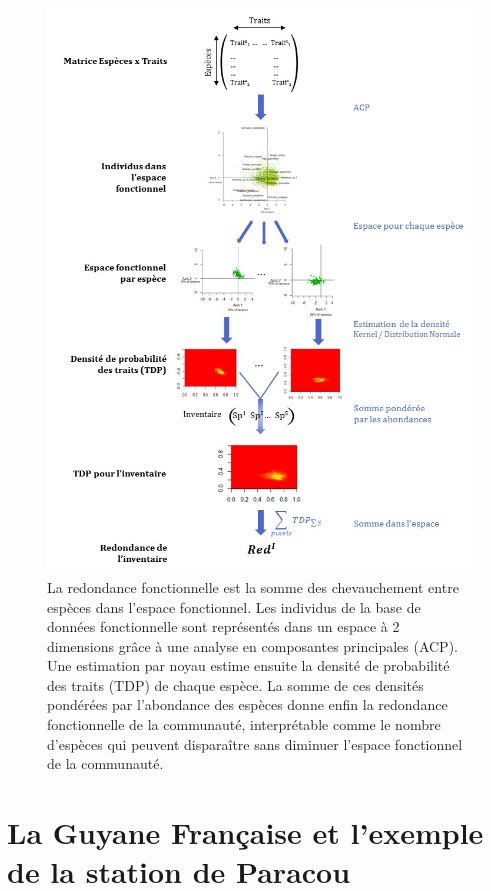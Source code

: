 \documentclass[
  11pt,
  french,
  A4paper,
  extrafontsizes,onecolumn,openright
  ]{memoir}
\begin{document}
\begin{figure}

{\centering \includegraphics[width=1\linewidth]{ExternalFig/Fig_MesureRedondance} 

}

\caption{La redondance fonctionnelle est la somme des chevauchement entre espèces dans l'espace fonctionnel. Les individus de la base de données fonctionnelle sont représentés dans un espace à 2 dimensions grâce à une analyse en composantes principales (ACP). Une estimation par noyau estime ensuite la densité de probabilité des traits (TDP) de chaque espèce. La somme de ces densités pondérées par l'abondance des espèces donne enfin la redondance fonctionnelle de la communauté, interprétable comme le nombre d'espèces qui peuvent disparaître sans diminuer l'espace fonctionnel de la communauté.}\label{fig:RedundancyMethod}
\end{figure}

\section{La Guyane Française et l'exemple de la station de
Paracou}\label{la-guyane-francaise-et-lexemple-de-la-station-de-paracou}
\end{document}
